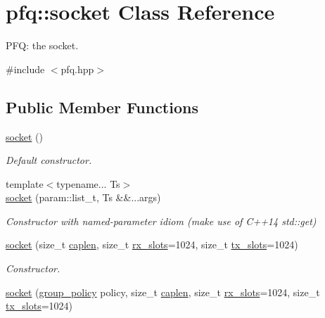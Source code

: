 \hypertarget{classpfq_1_1socket}{}\section{pfq\+:\+:socket Class Reference}
\label{classpfq_1_1socket}


P\+FQ\+: the socket.  




{\ttfamily \#include $<$pfq.\+hpp$>$}

\subsection*{Public Member Functions}
\begin{DoxyCompactItemize}
\item 
\hyperlink{classpfq_1_1socket_a169a46cd01a5fd0a71919ece48f18d9d}{socket} ()
\begin{DoxyCompactList}\small\item\em Default constructor. \end{DoxyCompactList}\item 
{\footnotesize template$<$typename... Ts$>$ }\\\hyperlink{classpfq_1_1socket_aa53695f39b45a0fa9520d52a1a35d2bf}{socket} (param\+::list\+\_\+t, Ts \&\&...args)
\begin{DoxyCompactList}\small\item\em Constructor with named-\/parameter idiom (make use of C++14 std\+::get) \end{DoxyCompactList}\item 
\hyperlink{classpfq_1_1socket_ad0e09474a9919723dfdf142e2b1e5386}{socket} (size\+\_\+t \hyperlink{classpfq_1_1socket_ab68dbba5ef01041b9c96758c4a9f0a6c}{caplen}, size\+\_\+t \hyperlink{classpfq_1_1socket_a5cf700fc12d67b91df3d669ac4aa737a}{rx\+\_\+slots}=1024, size\+\_\+t \hyperlink{classpfq_1_1socket_a019d15a072c043d6a1333ca0c836da4c}{tx\+\_\+slots}=1024)
\begin{DoxyCompactList}\small\item\em Constructor. \end{DoxyCompactList}\item 
\hyperlink{classpfq_1_1socket_a419985e445525a7dbfae6d9ace452427}{socket} (\hyperlink{namespacepfq_ac41249c8510558905b01fa4d866a38d7}{group\+\_\+policy} policy, size\+\_\+t \hyperlink{classpfq_1_1socket_ab68dbba5ef01041b9c96758c4a9f0a6c}{caplen}, size\+\_\+t \hyperlink{classpfq_1_1socket_a5cf700fc12d67b91df3d669ac4aa737a}{rx\+\_\+slots}=1024, size\+\_\+t \hyperlink{classpfq_1_1socket_a019d15a072c043d6a1333ca0c836da4c}{tx\+\_\+slots}=1024)

\end{DoxyCompactItemize}
